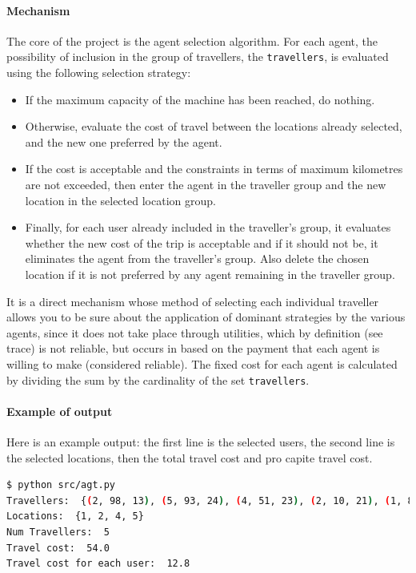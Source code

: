\documentclass{article}
\begin{document}
\paragraph*{Mechanism}
The core of the project is the agent selection algorithm. For each agent, the possibility of inclusion in the group of travellers, the \verb|travellers|, is evaluated using the following selection strategy:
\begin{itemize}
  \item If the maximum capacity of the machine has been reached, do nothing.
  \item Otherwise, evaluate the cost of travel between the locations already selected, and the new one preferred by the agent.
  \item If the cost is acceptable and the constraints in terms of maximum kilometres are not exceeded, then enter the agent in the traveller group and the new location in the selected location group.
  \item Finally, for each user already included in the traveller's group, it evaluates whether the new cost of the trip is acceptable and if it should not be, it eliminates the agent from the traveller's group. Also delete the chosen location if it is not preferred by any agent remaining in the traveller group.
\end{itemize}
It is a direct mechanism whose method of selecting each individual traveller allows you to be sure about the application of dominant strategies by the various agents, since it does not take place through utilities, which by definition (see trace) is not reliable, but occurs in based on the payment that each agent is willing to make (considered reliable).
The fixed cost for each agent is calculated by dividing the sum by the cardinality of the set \verb|travellers|.
\paragraph*{Example of output}
Here is an example output: the first line is the selected users, the second line is the selected locations, then the total travel cost and pro capite travel cost.
\begin{lstlisting}[language=bash]
$ python src/agt.py
Travellers:  {(2, 98, 13), (5, 93, 24), (4, 51, 23), (2, 10, 21), (1, 84, 24)}
Locations:  {1, 2, 4, 5}
Num Travellers:  5
Travel cost:  54.0
Travel cost for each user:  12.8
\end{lstlisting}
\end{document}
